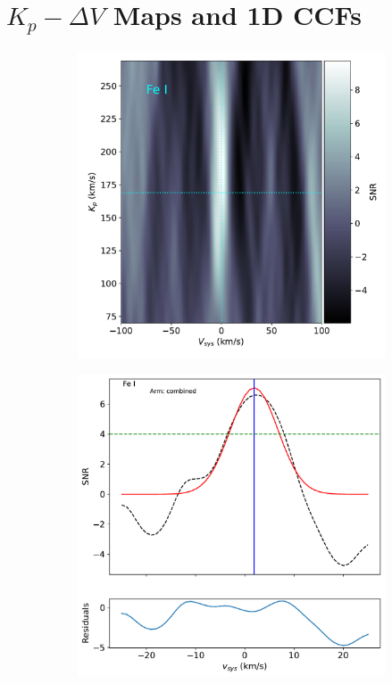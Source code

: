 \documentclass[twocolumn]{aastex631}
\begin{document}
        \section{${K_p-\Delta\!V}$ Maps and 1D CCFs}
        \begin{figure}[ht!]
            \centering
            \begin{subfigure}[b]{0.4\textwidth}
                \includegraphics[width=\textwidth]{plots-updated/kp-vsys-map/combined/KELT-20b.20190504.combined.Fe.CCFs-shifted.pdf}
                \caption{}\label{fig:2d-ccf-Fe-combined}
            \end{subfigure}
            \begin{subfigure}[b]{0.4\textwidth}
                \includegraphics[width=\textwidth]{plots-updated/line-profile/combined/KELT-20b.20190504.combined.Fe.SNR-Gaussian.pdf}

\end{subfigure}
\end{figure}
\end{document}
